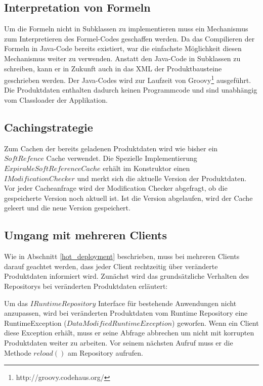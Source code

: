 \documentclass[headsepline=true, footsepline=true]{scrartcl}
\begin{document}
\subsection{Interpretation von Formeln}

Um die Formeln nicht in Subklassen zu implementieren muss ein Mechanismus zum
Interpretieren des Formel-Codes geschaffen werden. Da das Compilieren der
Formeln in Java-Code bereits existiert, war die einfachste Möglichkeit diesen
Mechanismus weiter zu verwenden. Anstatt den Java-Code in Subklassen zu
schreiben, kann er in Zukunft auch in das XML der Produktbausteine geschrieben
werden. Der Java-Codes wird zur Laufzeit von
Groovy\footnote{http://groovy.codehaus.org/} ausgeführt. Die Produktdaten
enthalten dadurch keinen Programmcode und sind unabhängig vom Classloader der Applikation.

\subsection{Cachingstrategie}

Zum Cachen der bereits geladenen Produktdaten wird wie bisher ein $SoftRefence$
Cache verwendet. Die Spezielle Implementierung $ExpirableSoftReferenceCache$
erhält im Konstruktor einen $IModificationChecker$ und merkt sich die aktuelle
Version der Produktdaten. Vor jeder Cacheanfrage wird der
Modification Checker abgefragt, ob die gespeicherte Version noch aktuell ist.
Ist die Version abgelaufen, wird der Cache geleert und die neue Version
gespeichert.


\subsection{Umgang mit mehreren Clients}

Wie in Abschnitt \ref{hot_deployment} beschrieben, muss bei mehreren Clients
darauf geachtet werden, dass jeder Client rechtzeitig über veränderte
Produktdaten informiert wird. Zunächst wird das grundsätzliche
Verhalten des Repositorys bei veränderten Produktdaten erläutert:

Um das $IRuntimeRepository$ Interface für bestehende Anwendungen nicht
anzupassen, wird bei veränderten Produktdaten vom Runtime Repository eine
RuntimeException ($DataModifiedRuntimeException$) geworfen. Wenn ein Client diese
Exception erhält, muss er seine Abfrage abbrechen um nicht mit korrupten
Produktdaten weiter zu arbeiten. Vor seinem nächsten Aufruf muss er die Methode
$reload()$ am Repository aufrufen.
\end{document}
